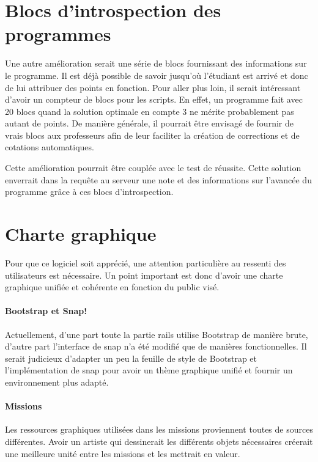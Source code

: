 \section{Blocs d'introspection des programmes}
Une autre amélioration serait une série de \glspl{bloc}  fournissant des informations sur le programme. Il est déjà possible de savoir jusqu'où l'étudiant est arrivé et donc de lui attribuer des points en fonction.
Pour aller plus loin, il serait intéressant d'avoir un compteur de \glspl{bloc}  pour les \glspl{script}. En effet, un programme fait avec 20 \glspl{bloc}  quand la solution optimale en compte 3 ne mérite probablement pas autant de points.
De manière générale, il pourrait être envisagé de fournir de vrais \glspl{bloc}  aux professeurs afin de leur faciliter la création de corrections et de cotations automatiques.

Cette amélioration pourrait être couplée avec le test de réussite. Cette solution enverrait dans la requête au serveur une note et des informations sur l'avancée du programme grâce à ces \glspl{bloc}  d'introspection.

\section{Charte graphique}
Pour que ce logiciel soit apprécié, une attention particulière au ressenti des utilisateurs est nécessaire. Un point important est donc d'avoir une charte graphique unifiée et cohérente en fonction du public visé.

\paragraph{Bootstrap et Snap!}
Actuellement, d'une part toute la partie \gls{rails} utilise Bootstrap de manière brute, d'autre part l'interface de \gls{snap} n'a été modifié que de manières fonctionnelles. Il serait judicieux d'adapter un peu la feuille de style de Bootstrap et l'implémentation de \gls{snap} pour avoir un thème graphique unifié et fournir un environnement plus adapté.

\paragraph{Missions}
Les ressources graphiques utilisées dans les \glspl{mission} proviennent toutes de sources différentes. Avoir un artiste qui dessinerait les différents objets nécessaires créerait une meilleure unité entre les \glspl{mission} et les mettrait en valeur.


